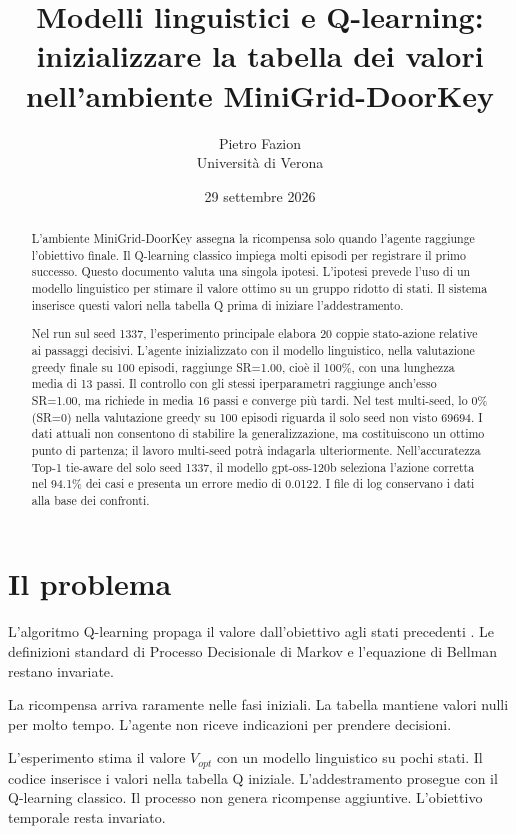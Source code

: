 \documentclass[12pt,a4paper]{article}
\title{Modelli linguistici e Q-learning: inizializzare la tabella dei valori nell'ambiente MiniGrid-DoorKey}
\author{Pietro Fazion\\Universit\`a di Verona}
\date{29 settembre 2026}
\begin{document}
\maketitle

\begin{abstract}
L'ambiente MiniGrid-DoorKey assegna la ricompensa solo quando l'agente raggiunge l'obiettivo finale. Il Q-learning classico impiega molti episodi per registrare il primo successo. Questo documento valuta una singola ipotesi. L'ipotesi prevede l'uso di un modello linguistico per stimare il valore ottimo su un gruppo ridotto di stati. Il sistema inserisce questi valori nella tabella Q prima di iniziare l'addestramento.

Nel run sul seed 1337, l'esperimento principale elabora 20 coppie stato-azione relative ai passaggi decisivi. L'agente inizializzato con il modello linguistico, nella valutazione greedy finale su 100 episodi, raggiunge SR=1.00, cioè il 100\%, con una lunghezza media di 13 passi. Il controllo con gli stessi iperparametri raggiunge anch'esso SR=1.00, ma richiede in media 16 passi e converge più tardi. Nel test multi-seed, lo 0\% (SR=0) nella valutazione greedy su 100 episodi riguarda il solo seed non visto 69694. I dati attuali non consentono di stabilire la generalizzazione, ma costituiscono un ottimo punto di partenza; il lavoro multi-seed potrà indagarla ulteriormente. Nell'accuratezza Top-1 tie-aware del solo seed 1337, il modello gpt-oss-120b seleziona l'azione corretta nel 94.1\% dei casi e presenta un errore medio di 0.0122. I file di log conservano i dati alla base dei confronti.
\end{abstract}
\tableofcontents
\newpage

\section{Il problema}\label{sec:problema}
L'algoritmo Q-learning propaga il valore dall'obiettivo agli stati precedenti \cite{sutton2018}. Le definizioni standard di Processo Decisionale di Markov e l'equazione di Bellman restano invariate.

La ricompensa arriva raramente nelle fasi iniziali. La tabella mantiene valori nulli per molto tempo. L'agente non riceve indicazioni per prendere decisioni.

L'esperimento stima il valore $V_{opt}$ con un modello linguistico su pochi stati. Il codice inserisce i valori nella tabella Q iniziale. L'addestramento prosegue con il Q-learning classico. Il processo non genera ricompense aggiuntive. L'obiettivo temporale resta invariato.
\end{document}
